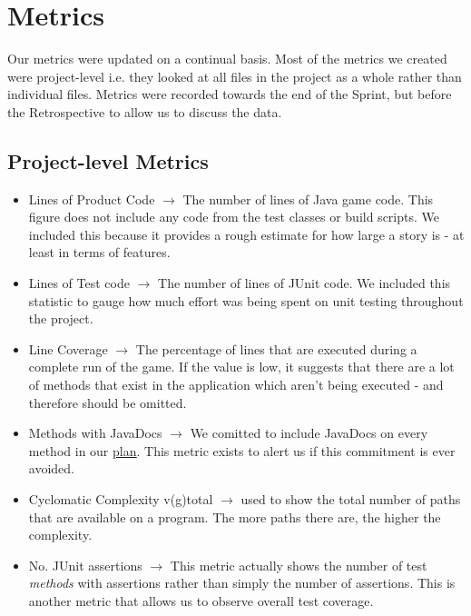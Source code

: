 \documentclass[12pt]{article}
\begin{document}
\newpage

\section{Metrics}

Our metrics were updated on a continual basis. Most of the metrics we created were project-level i.e. they looked at all files in the project as a whole rather than individual files. Metrics were recorded towards the end of the Sprint, but before the Retrospective to allow us to discuss the data.

\subsection{Project-level Metrics}

\vspace{0.3cm}
\begin{center}
    \noindent{}
\end{center}

\begin{itemize}
    \item Lines of Product Code $\longrightarrow$ The number of lines of Java game code. This figure does not include any code from the test classes or build scripts. We included this because it provides a rough estimate for how large a story is - at least in terms of features.
    \item Lines of Test code $\longrightarrow$ The number of lines of JUnit code. We included this statistic to gauge how much effort was being spent on unit testing throughout the project.
    \item Line Coverage $\longrightarrow$ The percentage of lines that are executed during a complete run of the game. If the value is low, it suggests that there are a lot of methods that exist in the application which aren't being executed - and therefore should be omitted. 
    \item Methods with JavaDocs $\longrightarrow$ We comitted to include JavaDocs on every method in our \underline{\hyperref[practices]{plan}}. This metric exists to alert us if this commitment is ever avoided.
    \item Cyclomatic Complexity v(g)total $\longrightarrow$ used to show the total number of paths that are available on a program. The more paths there are, the higher the complexity.
    \item No. JUnit assertions $\longrightarrow$ This metric actually shows the number of test \emph{methods} with assertions rather than simply the number of assertions. This is another metric that allows us to observe overall test coverage.
\end{itemize}
\newpage
\end{document}

